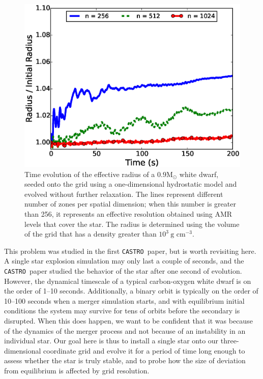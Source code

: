 \documentclass[iop,numberedappendix]{../emulateapj}
\newcommand{\msolar}{\mathrm{M}_\odot}
\newcommand{\castro}{\texttt{CASTRO}}
\begin{document}
\begin{figure}
  \centering
  \includegraphics[scale=0.45]{plots/single_star_static_1e3_radius}
  \caption{Time evolution of the effective radius of a $0.9 \msolar$ 
    white dwarf, seeded onto the grid using a one-dimensional hydrostatic
    model and evolved without further relaxation. The lines represent 
    different number of zones per spatial dimension; when this number is 
    greater than 256, it represents an effective resolution obtained 
    using AMR levels that cover the star. The radius is determined 
    using the volume of the grid that has a density greater than $10^3\ \text{g cm}^{-3}.$
    \label{fig:single_star_static_radius}}
\end{figure}

This problem was studied in the first \castro\ paper, but is worth
revisiting here. A single star explosion simulation may only last a
couple of seconds, and the \castro\ paper studied the behavior of the
star after one second of evolution. However, the dynamical timescale
of a typical carbon-oxygen white dwarf is on the order of 1--10
seconds. Additionally, a binary orbit is typically on the order of
10--100 seconds when a merger simulation starts, and with equilibrium
initial conditions the system may survive for tens of orbits before
the secondary is disrupted. When this does happen, we want to be
confident that it was because of the dynamics of the merger process
and not because of an instability in an individual star. Our goal here
is thus to install a single star onto our three-dimensional
coordinate grid and evolve it for a period of time long enough to
assess whether the star is truly stable, and to probe how the size of
deviation from equilibrium is affected by grid resolution.
\end{document}
